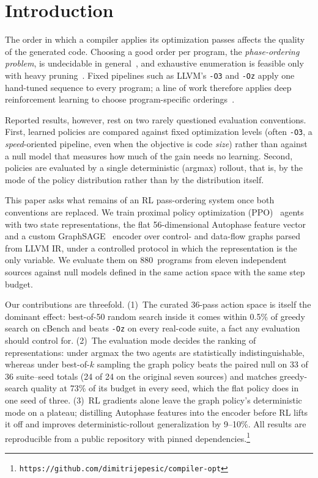 \documentclass[conference,a4paper]{IEEEtran}
\begin{document}
\section{Introduction}
The order in which a compiler applies its optimization passes affects
the quality of the generated code. Choosing a good order per program,
the \emph{phase-ordering problem}, is undecidable in
general~\cite{touati2006}, and exhaustive enumeration is feasible only
with heavy pruning~\cite{kulkarni2006}. Fixed pipelines such as LLVM's
\texttt{-O3} and \texttt{-Oz} apply one hand-tuned sequence to every
program; a line of work therefore applies deep reinforcement learning
to choose program-specific
orderings~\cite{autophase,compilergym,posetrl,coreset}.

Reported results, however, rest on two rarely questioned evaluation
conventions. First, learned policies are compared against fixed
optimization levels (often \texttt{-O3}, a \emph{speed}-oriented
pipeline, even when the objective is code \emph{size}) rather than
against a null model that measures how much of the gain needs no
learning. Second, policies are evaluated by a single
deterministic (argmax) rollout, that is, by the mode of the policy
distribution rather than by the distribution itself.

This paper asks what remains of an RL pass-ordering system once both
conventions are replaced. We train proximal policy optimization
(PPO)~\cite{ppo} agents with two state representations, the flat
56-dimensional Autophase feature vector~\cite{autophase} and a custom
GraphSAGE~\cite{graphsage} encoder over control- and data-flow graphs
parsed from LLVM IR, under a controlled protocol in which the
representation is the only variable. We evaluate them on 880~programs
from eleven independent sources against null models defined in the
same action space with the same step budget.

Our contributions are threefold. (1)~The curated 36-pass action space
is itself the dominant effect: best-of-50 random search inside it comes
within 0.5\% of greedy search on cBench and beats \texttt{-Oz} on every
real-code suite, a fact any evaluation should control for. (2)~The
evaluation mode decides the ranking of representations: under argmax
the two agents are statistically indistinguishable, whereas under
best-of-$k$ sampling the graph policy beats the paired null on 33 of 36
suite--seed totals (24 of 24 on the original seven sources) and matches
greedy-search quality at 73\% of its budget in every seed, which the
flat policy does in one seed of three. (3)~RL gradients alone leave the
graph policy's deterministic mode on a plateau; distilling Autophase
features into the encoder before RL lifts it off and improves
deterministic-rollout generalization by 9--10\%. All results are reproducible from a public repository with
pinned dependencies.\footnote{\texttt{https://github.com/dimitrijepesic/compiler-opt}}
\end{document}
